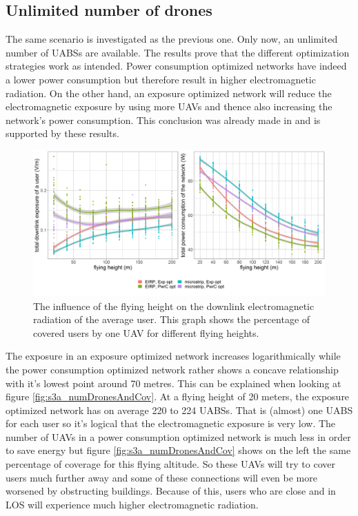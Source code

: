 \documentclass[twocolumn]{phdsymp} %
\begin{document}
\subsection{Unlimited number of drones}
The same scenario is investigated as the previous one. Only now, an unlimited number of \gls{UABS}s are available.
The results prove that the different optimization strategies work as intended.
Power consumption optimized networks have indeed a lower power consumption but therefore result in higher electromagnetic radiation.
On the other hand, an exposure optimized network will reduce the electromagnetic exposure by using more \gls{UAV}s and thence also increasing the network's power consumption.
This conclusion was already made  in \cite{J1} and is supported by these results.
\begin{figure}[h!]
  \includegraphics[width=\linewidth]{../results/s3/fhvsdlAndPc.png}
  \caption{The influence of the flying height on the downlink electromagnetic radiation of the average user. This graph shows the percentage of covered users by one \gls{UAV} for different flying heights.}
  \label{fig:s3a_dlAndPc}
\end{figure}

The exposure in an exposure optimized network increases logarithmically while the power consumption optimized network rather 
shows a concave relationship with it's lowest point around 70 metres.
This can be explained when looking at figure \ref{fig:s3a_numDronesAndCov}.
At a flying height of 20 meters, the exposure optimized network has on average 220 to 224 \gls{UABS}s. That is (almost) one \gls{UABS} for each user
so it's logical that the electromagnetic exposure is very low.
The number of \gls{UAV}s in a power consumption optimized network is much less in order 
to save energy but figure \ref{fig:s3a_numDronesAndCov} shows on the left the same percentage of coverage for this flying altitude.
So these \gls{UAV}s will try to cover users much further away and some of these connections will even be more worsened by obstructing buildings.
Because of this, users who are close and in \gls{LOS} will experience much higher electromagnetic radiation.
\end{document}
